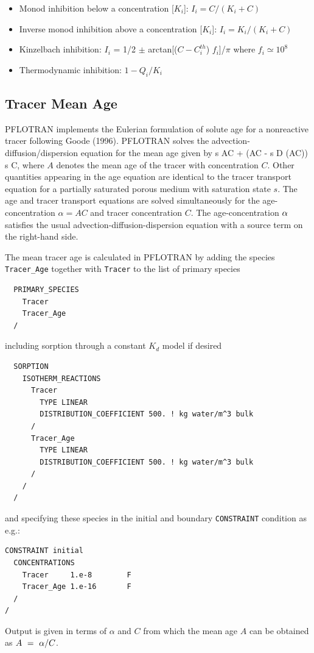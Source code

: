 \noindent
\begin{itemize}
\item Monod inhibition below a concentration [$K_i$]: $I_i = C / (K_i + C)$\\
\item Inverse monod inhibition above a concentration [$K_i$]: $I_i = K_i / (K_i + C)$\\
\item Kinzelbach inhibition: $I_i$ = 1/2 $\pm$ arctan[($C-C_i^{th}$) $f_i$]/$\pi$ where $f _i\simeq 10^8$\\
\item Thermodynamic inhibition: $1-Q_i/K_i$
\end{itemize}

\subsection{Tracer Mean Age}

PFLOTRAN implements the Eulerian formulation of solute age for a nonreactive tracer following Goode (1996). PFLOTRAN solves the advection-diffusion/dispersion equation for the mean age given by
\EQ
{} \varphi s AC + \bnabla\cdot\Big(\bq AC - \varphi s D \bnabla (AC)\Big) \eq \varphi s C,
\EN
where $A$ denotes the mean age of the tracer with concentration $C$. Other quantities appearing in the age equation are identical to the tracer transport equation for a partially saturated porous medium with saturation state $s$. The age and tracer transport equations are solved simultaneously for the age-concentration $\alpha = A C$ and tracer concentration $C$. The age-concentration ${\alpha}$ satisfies the usual advection-diffusion-dispersion equation with a source term on the right-hand side.

The mean tracer age is calculated in PFLOTRAN by adding the species {\tt Tracer\_Age} together with {\tt Tracer} to the list of primary species
\footnotesize
\begin{verbatim}
  PRIMARY_SPECIES
    Tracer
    Tracer_Age
  /
\end{verbatim}
\normalsize
including sorption through a constant $K_d$ model if desired
\footnotesize
\begin{verbatim}
  SORPTION
    ISOTHERM_REACTIONS
      Tracer
        TYPE LINEAR 
        DISTRIBUTION_COEFFICIENT 500. ! kg water/m^3 bulk
      /
      Tracer_Age
        TYPE LINEAR 
        DISTRIBUTION_COEFFICIENT 500. ! kg water/m^3 bulk
      /
    /
  /
\end{verbatim}
\normalsize
and specifying these species in the initial and boundary {\tt CONSTRAINT} condition as e.g.:
\footnotesize
\begin{verbatim}
CONSTRAINT initial
  CONCENTRATIONS
    Tracer     1.e-8        F
    Tracer_Age 1.e-16       F
  /
/
\end{verbatim}
\normalsize
Output is given in terms of $\alpha$ and $C$ from which the mean age $A$ can be obtained as $A\ =\ \alpha/C$. 

